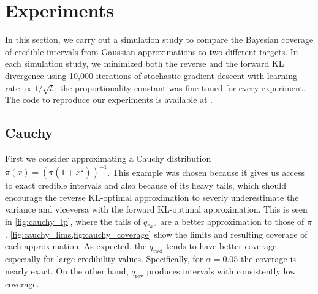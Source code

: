 \section{Experiments} \label{sec:experiments}

In this section,
we carry out a simulation study to compare
the Bayesian coverage of credible intervals
from Gaussian approximations to two different targets.
In each simulation study,
we minimized both the reverse and the forward KL divergence
using 10,000 iterations of stochastic gradient descent
with learning rate $\propto 1/\sqrt{t}$;
the proportionality constant was fine-tuned for every experiment.
The code to reproduce our experiments is available at .


\subsection{Cauchy} \label{subsec:cauchy}

First we consider approximating a Cauchy distribution
$\pi(x)=(\pi(1+x^2))^{-1}$.
This example was chosen because it gives us access to exact
credible intervals and also because of its heavy tails,
which should encourage the reverse KL-optimal
approximation to severly underestimate the variance
and viceversa with the forward KL-optimal approximation.
This is seen in \cref{fig:cauchy_lp},
where the tails of $q_\mathrm{fwd}$ are a better
approximation to those of $\pi$.
\cref{fig:cauchy_lims,fig:cauchy_coverage}
show the limits and resulting coverage of each approximation.
As expected, the $q_\mathrm{fwd}$ tends to have better coverage,
especially for large credibility values.
Specifically, for $\alpha=0.05$
the coverage is nearly exact.
On the other hand, $q_\mathrm{rev}$ produces
intervals with consistently low coverage.

